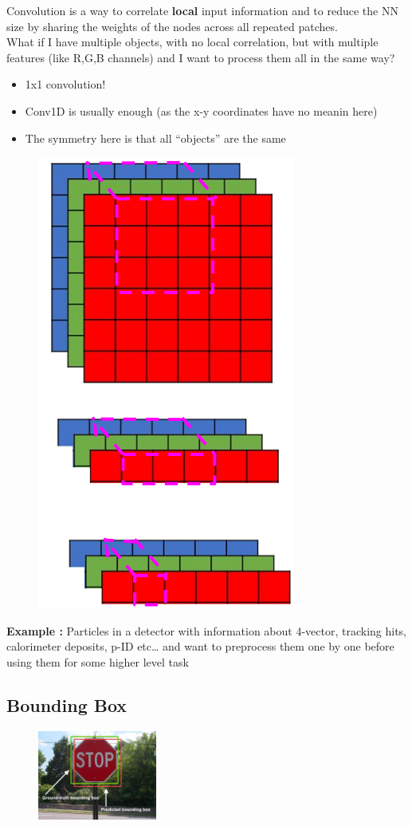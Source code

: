 Convolution is a way to correlate \textbf{local} input information and to reduce the NN size by sharing the weights of the nodes across all repeated patches.\\

What if I have multiple objects, with no local correlation, but with multiple features (like R,G,B channels) and I want to process them all in the same way?
\begin{itemize}
	\item 1x1 convolution!
	\item Conv1D is usually enough (as the x-y coordinates have no meanin here)
	\item The symmetry here is that all “objects” are the same
\end{itemize}

\begin{figure}[ht]
	\centering
	\includegraphics[width=0.3\linewidth]{figure_ml/more_conv.png}
\end{figure}
\FloatBarrier

\textbf{Example :} Particles in a detector with information about 4-vector, tracking hits, calorimeter deposits, p-ID etc… and want to preprocess them one by one before using them for some higher level task


\subsection{Bounding Box}

\begin{figure}
	\includegraphics[width=0.35\textwidth]{figure_ml/stop_bb.png}
\end{figure}

